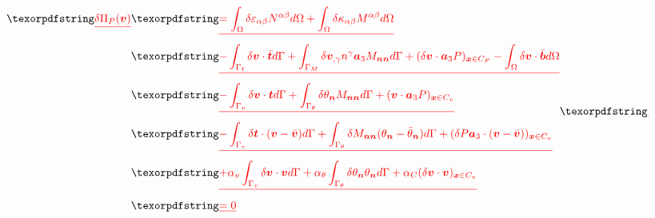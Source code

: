 \DIFdelbegin \begin{displaymath}
\begin{split}
\DIFdel{\delta \Pi_P(\boldsymbol v) }&\DIFdel{= \int_\Omega\delta \varepsilon_{\alpha\beta} N^{\alpha\beta} d\Omega +
\int_\Omega \delta \kappa_{\alpha\beta}M^{\alpha\beta} d\Omega }\\
                     &\DIFdel{- \int_{\Gamma_t} \delta \boldsymbol v \cdot \bar{\boldsymbol t} d\Gamma 
                     + \int_{\Gamma_M} \delta \boldsymbol v_{,\gamma} n^\gamma \boldsymbol a_3 M_{\boldsymbol{nn}} d\Gamma
                     + (\delta \boldsymbol v \cdot \boldsymbol a_3 P)_{\boldsymbol x \in C_P}
                     - \int_\Omega \delta \boldsymbol v \cdot \bar{\boldsymbol b} d\Omega }\\
                     &\DIFdel{- \int_{\Gamma_v} \delta \boldsymbol v \cdot \boldsymbol t d\Gamma 
                     + \int_{\Gamma_\theta} \delta \theta_{\boldsymbol n} M_{\boldsymbol{nn}}d\Gamma 
                     + (\boldsymbol v \cdot \boldsymbol a_3 P)_{\boldsymbol x \in C_v}}\\
                     &\DIFdel{- \int_{\Gamma_v} \delta \boldsymbol t \cdot (\boldsymbol v - \bar{\boldsymbol v}) d\Gamma
                     + \int_{\Gamma_\theta} \delta M_{\boldsymbol{nn}}(\theta_{\boldsymbol n} - \bar \theta_{\boldsymbol n})d\Gamma
                     + (\delta P\boldsymbol a_3 \cdot (\boldsymbol v - \bar{\boldsymbol v}))_{\boldsymbol x \in C_v} }\\
                     &\DIFdel{+ \alpha_v \int_{\Gamma_v} \delta \boldsymbol v \cdot \boldsymbol v d\Gamma 
                     + \alpha_\theta \int_{\Gamma_\theta} \delta \theta_{\boldsymbol n}\theta_{\boldsymbol n} d\Gamma
                     + \alpha_C(\delta \boldsymbol v \cdot \boldsymbol v)_{\boldsymbol x\in C_v} }\\
                     &\DIFdel{= 0
}\end{split}
\DIFdel{}\end{displaymath}%
